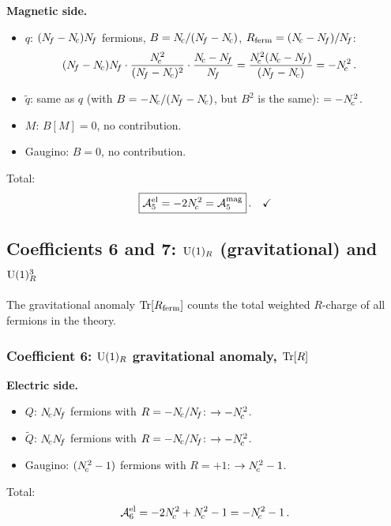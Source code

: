 \documentclass[11pt,a4paper]{article}
\begin{document}
\textbf{Magnetic side.}
\begin{itemize}
  \item $q$: $(N_{\!f} - N_{\!c})N_{\!f}$ fermions,
    $B = N_{\!c}/(N_{\!f} - N_{\!c})$,
    $R_{\text{ferm}} = (N_{\!c} - N_{\!f})/N_{\!f}$:
    \begin{align*}
      (\Nf - \Nc)\Nf \cdot \frac{\Nc^2}{(\Nf - \Nc)^2}
      \cdot \frac{\Nc - \Nf}{\Nf}
      &= \frac{\Nc^2(\Nc - \Nf)}{(\Nf - \Nc)}
      = -\Nc^2\,.
    \end{align*}
  \item $\widetilde{q}$: same as $q$ (with $B = -N_{\!c}/(N_{\!f} - N_{\!c})$, but
    $B^2$ is the same):
    $= -N_{\!c}^2$.
  \item $M$: $B[M] = 0$, no contribution.
  \item Gaugino: $B = 0$, no contribution.
\end{itemize}
Total:
\begin{equation}\label{eq:anom5}
  \boxed{\mathcal{A}^{\text{el}}_5 = -2N_{\!c}^2
    = \mathcal{A}^{\text{mag}}_5}\,.
  \quad\checkmark
\end{equation}

\subsection{Coefficients 6 and 7: $\mathrm{U}(1)_R$ (gravitational) and $\mathrm{U}(1)_R^3$}
\label{ssec:anom6}

The gravitational anomaly $\mathrm{Tr}[R_{\text{ferm}}]$ counts the total weighted
$R$-charge of all fermions in the theory.

\subsubsection*{Coefficient 6: $\mathrm{U}(1)_R$ gravitational anomaly, $\mathrm{Tr}[R]$}

\textbf{Electric side.}
\begin{itemize}
  \item $Q$: $N_{\!c} N_{\!f}$ fermions with $R = -N_{\!c}/N_{\!f}$: $\to -N_{\!c}^2$.
  \item $\widetilde{Q}$: $N_{\!c} N_{\!f}$ fermions with $R = -N_{\!c}/N_{\!f}$: $\to -N_{\!c}^2$.
  \item Gaugino: $(N_{\!c}^2 - 1)$ fermions with $R = +1$: $\to N_{\!c}^2 - 1$.
\end{itemize}
Total:
\[
  \mathcal{A}^{\text{el}}_{6}
  = -2N_{\!c}^2 + N_{\!c}^2 - 1 = -N_{\!c}^2 - 1\,.
\]
\end{document}
